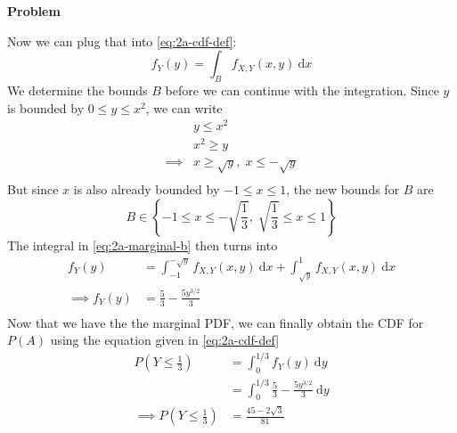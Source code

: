 \documentclass[12pt]{article}
\newenvironment{Ex}{\textbf{Problem}\vspace{.75em}\\}{}
\newcommand{\dd}[1]{\:\mathrm{d}{#1}}
\begin{document}
\begin{enumerate}
\begin{Ex}
\begin{solution}
\begin{enumerate}
        Now we can plug that into \cref{eq:2a-cdf-def}:
        \begin{equation}
          \label{eq:2a-marginal-b}
          f_Y(y) = \int_{B} f_{X,Y}(x,y) \dd{x}
        \end{equation}
        We determine the bounds $B$ before we can continue with the
        integration. Since $y$ is bounded by $0\le y \le x^2$, we can
        write
        \begin{equation}
          \label{eq:2a-y-bounds}
          \begin{aligned}
            & y \le x^2 \\
            & x^2 \ge y \\
            \implies & x \ge \sqrt{y},\; x \le -\sqrt{y} \\
          \end{aligned}
        \end{equation}
        But since $x$ is also already bounded by $-1 \le x \le 1$, the
        new bounds for $B$ are
        \begin{equation}
          \label{eq:2a-new-y-bounds}
          B \in \left\{-1\le x\le-\sqrt{\frac{1}{3}},\;
            \sqrt{\frac{1}{3}}\le x\le1\right\}
        \end{equation}
        The integral in \cref{eq:2a-marginal-b} then turns into
        \begin{equation}
          \label{eq:2a-marginal}
          \begin{aligned}
            f_Y(y) &= \int_{-1}^{-\sqrt{y}} f_{X,Y}(x,y)
            \dd{x} + \int_{\sqrt{y}}^{1} f_{X,Y}(x,y)
            \dd{x}\\
            \implies f_Y(y) &= \frac{5}{3}-\frac{5y^{3/2}}{3} \\
          \end{aligned}
        \end{equation}
        Now that we have the the marginal PDF, we can finally obtain
        the CDF for $P(A)$ using the equation given in \cref{eq:2a-cdf-def}
        \begin{equation}
          \label{eq:2a-cdf-plugged}
          \begin{aligned}
            P\left(Y \le \frac{1}{3}\right) &= \int_{0}^{1/3}
            f_{Y}(y) \dd{y} \\
            &= \int_{0}^{1/3} \frac{5}{3}-\frac{5y^{3/2}}{3}
            \dd{y} \\
            \implies P\left(Y \le \frac{1}{3}\right) &=
            \frac{45-2\sqrt{3}}{81} \\

\end{aligned}
\end{equation}
\end{enumerate}
\end{solution}
\end{Ex}
\end{enumerate}
\end{document}
